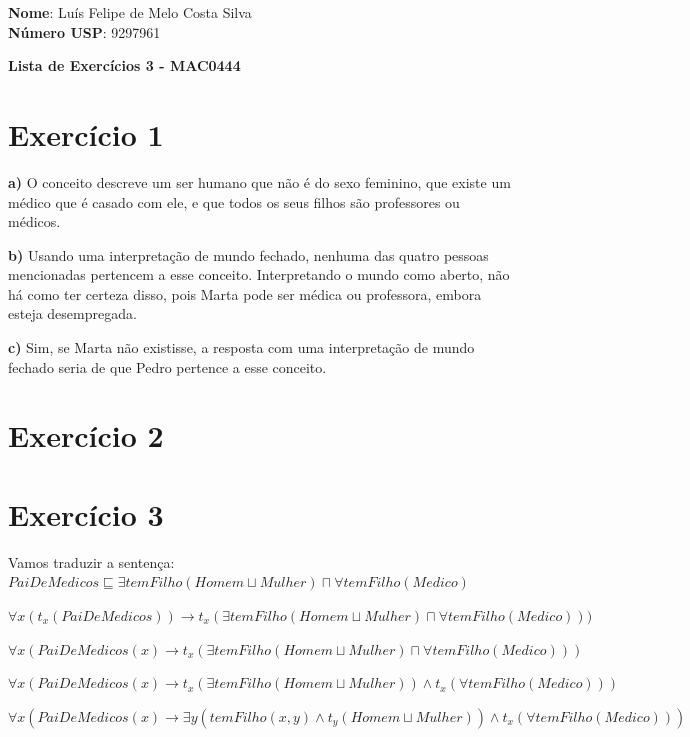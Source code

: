 \documentclass[12pt,letterpaper]{article}
\begin{document}
	
	\large \textbf{Nome}: Luís Felipe de Melo Costa Silva \\
	\textbf{Número USP}: 9297961 
    
	\begin{center}
		\LARGE \bf
		Lista de Exercícios 3 - MAC0444
	\end{center}

	\begin{normalsize}
		\section*{Exercício 1}
		
		\textbf{a)} O conceito descreve um ser humano que não é do sexo feminino, que existe um médico que é casado com ele, e que todos os seus filhos são professores ou médicos.
		
		\textbf{b)} Usando uma interpretação de mundo fechado, nenhuma das quatro pessoas mencionadas pertencem a esse conceito. Interpretando o mundo como aberto, não há como ter certeza disso, pois Marta pode ser médica ou professora, embora esteja desempregada.
		
		\textbf{c)} Sim, se Marta não existisse, a resposta com uma interpretação de mundo fechado seria de que Pedro pertence a esse conceito.
		
		\section*{Exercício 2}
		
		\section*{Exercício 3}
		
		Vamos traduzir a sentença: \\
		
		$PaiDeMedicos \sqsubseteq \exists temFilho(Homem \sqcup Mulher) \sqcap \forall temFilho(Medico)$
		
		$\forall x(t_x(PaiDeMedicos)) \to t_x(\exists temFilho(Homem \sqcup Mulher) \sqcap \forall temFilho(Medico)))$
		
		$\forall x(PaiDeMedicos(x) \to t_x(\exists temFilho(Homem \sqcup Mulher) \sqcap \forall temFilho(Medico)))$
		
		$\forall x(PaiDeMedicos(x) \to t_x(\exists temFilho(Homem \sqcup Mulher)) \land t_x(\forall temFilho(Medico)))$
		
		$\forall x(PaiDeMedicos(x) \to \exists y(temFilho(x,y) \land t_y(Homem \sqcup Mulher)) \land t_x(\forall temFilho(Medico)))$
		

\end{normalsize}
\end{document}
